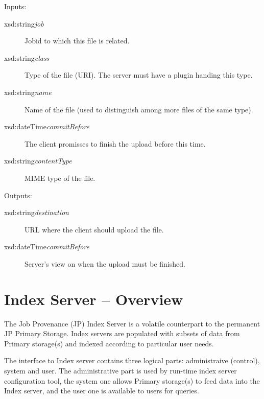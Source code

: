 Inputs: 
\begin{description}
\item[{xsd:string{\ttfamily\itshape{{job}}}}]\null{}
Jobid to which this file is related.
\item[{xsd:string{\ttfamily\itshape{{class}}}}]\null{}
Type of the file (URI). The server must have a plugin handing this type.
\item[{xsd:string{\ttfamily\itshape{{name}}}}]\null{}
Name of the file (used to distinguish among more files of the same type).
\item[{xsd:dateTime{\ttfamily\itshape{{commitBefore}}}}]\null{}
The client promisses to finish the upload before this time.
\item[{xsd:string{\ttfamily\itshape{{contentType}}}}]\null{}
MIME type of the file.
\end{description}
\noindent 

Outputs: 
\begin{description}
\item[{xsd:string{\ttfamily\itshape{{destination}}}}]\null{}
URL where the client should upload the file.
\item[{xsd:dateTime{\ttfamily\itshape{{commitBefore}}}}]\null{}
Server's view on when the upload must be finished.
\end{description}
\noindent 

\section{Index Server -- Overview}
\label{id214261}\hypertarget{id214261}{}%

The Job Provenance (JP) Index Server is a volatile counterpart to the permanent JP Primary Storage. Index servers are populated with subsets of data from Primary storage(s) and indexed according to particular user needs.

The interface to Index server contains three logical parts: administraive (control), system and user. The administrative part is used by run-time index server configuration tool, the system one allows Primary storage(s) to feed data into the Index server, and the user one is available to users for queries.

